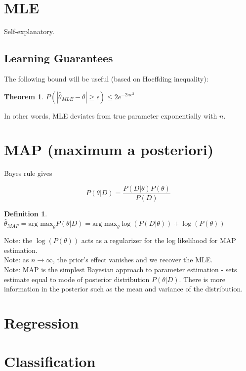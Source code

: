 \documentclass[a4paper]{article}\usepackage[]{graphicx}\usepackage[]{color}
\newtheorem{thm}{Theorem}[section]
\newtheorem{defn}{Definition}[section]
\begin{document}
\section{MLE}

Self-explanatory. 

\subsection{Learning Guarantees}

The following bound will be useful (based on Hoeffding inequality): 

\begin{thm}
$P(|\hat{\theta}_{MLE}-\theta| \geq \epsilon) \leq 2e^{-2n\epsilon^2}$
\end{thm}

In other words, MLE deviates from true parameter exponentially with $n$. 

\section{MAP (maximum a posteriori)}

Bayes rule gives 

\begin{equation*}
P(\theta|D) = \frac{P(D|\theta)P(\theta)}{P(D)}
\end{equation*}

\begin{defn}
$\hat{\theta}_{MAP} = \mbox{arg max}_{\theta} P(\theta|D) = \mbox{arg max}_{\theta} \log(P(D|\theta)) + \log(P(\theta)) $
\end{defn}

Note: the $\log(P(\theta))$ acts as a regularizer for the log likelihood for MAP estimation. \\
Note: as $n \rightarrow \infty$, the prior's effect vanishes and we recover the MLE.\\
Note: MAP is the simplest Bayesian approach to parameter estimation - sets estimate equal to mode of posterior distribution $P(\theta|D)$. There is more information in the posterior such as the mean and variance of the distribution. 


\section{Regression}


\section{Classification}
\end{document}
